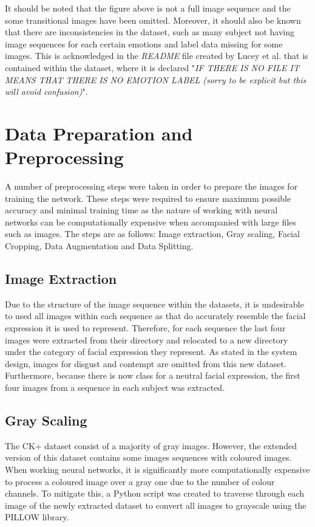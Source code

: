 It should be noted that the figure above is not a full image sequence and the some transitional images have been omitted. Moreover, it should also be known that there are inconsistencies in the dataset, such as many subject not having image sequences for each certain emotions and label data missing for some images. This is acknowledged in the \textit{README} file created by Lucey et al. that is contained within the dataset, where it is declared "\textit{IF THERE IS NO FILE IT MEANS THAT THERE IS NO EMOTION LABEL (sorry to be explicit but this will avoid confusion)}". 

\section{Data Preparation and Preprocessing}
A number of preprocessing steps were taken in order to prepare the images for training the network. These steps were required to ensure maximum possible accuracy and minimal training time as the nature of working with neural networks can be computationally expensive when accompanied with large files such as images. The steps are as follows: Image extraction, Gray scaling, Facial Cropping, Data Augmentation and Data Splitting.

\subsection{Image Extraction}
Due to the structure of the image sequence within the datasets, it is undesirable to used all images within each sequence as that do accurately resemble the facial expression it is used to represent. Therefore, for each sequence the last four images were extracted from their directory and relocated to a new directory under the category of facial expression they represent. As stated in the system design, images for disgust and contempt are omitted from this new dataset. Furthermore, because there is now class for a neutral facial expression, the first four images from a sequence in each subject was extracted.

\subsection{Gray Scaling}
The CK+ dataset consist of a majority of gray images. However, the extended version of this dataset contains some images sequences with coloured images. When working neural networks, it is significantly more computationally expensive to process a coloured image over a gray one due to the number of colour channels. To mitigate this, a Python script was created to traverse through each image of the newly extracted dataset to convert all images to grayscale using the PILLOW library. \\

